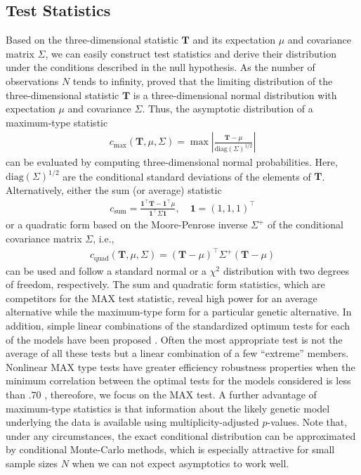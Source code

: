\documentclass[bimj,fleqn]{w-art}
\newcommand{\T}{\mathbf{T}}
\begin{document}
\subsection{Test Statistics}

Based on the three-dimensional statistic $\T$ and its expectation 
$\mu$ and covariance matrix $\Sigma$, we can easily construct test 
statistics and derive their distribution under the conditions
described in the null hypothesis. As the number of observations 
$N$ tends to infinity, \citet{StrasserWeber1999}
proved that the limiting distribution of the three-dimensional 
statistic $\T$ is a three-dimensional normal distribution with 
expectation $\mu$ and covariance $\Sigma$. Thus, the asymptotic distribution
of a maximum-type statistic
\begin{eqnarray*}
c_\text{max}(\T, \mu, \Sigma)  = \max \left| \frac{\T - \mu}{\text{diag}(\Sigma)^{1/2}} \right|
\end{eqnarray*}
can be evaluated by computing three-dimensional normal probabilities. Here,
$\text{diag}(\Sigma)^{1/2}$ are the conditional standard deviations of
the elements of $\T$. Alternatively, either the sum (or average) statistic
\begin{eqnarray*}
c_\text{sum} = \frac{\mathbf{1}^\top \T - \mathbf{1}^\top\mu}{\mathbf{1}^\top \Sigma \mathbf{1}}, \quad \mathbf{1} = (1, 1, 1)^\top
\end{eqnarray*}
or a quadratic form 
based on the Moore-Penrose inverse $\Sigma^+$ of the conditional covariance
matrix $\Sigma$, i.e.,
\begin{eqnarray*}
c_\text{quad}(\T, \mu, \Sigma)  = (\T - \mu)^\top \Sigma^+ (\T - \mu)
\end{eqnarray*}
can be used and 
follow a standard normal or a $\chi^2$ distribution with two degrees of freedom, respectively. 
The sum and quadratic form statistics, which are competitors for the MAX 
test statistic, reveal high power for an average alternative while the maximum-type 
form for a particular genetic alternative.
In addition, simple linear combinations of the standardized optimum tests for each of
the models have been proposed \citep{Gastwirth:1985}. Often the most appropriate test is not the
average of all these tests but a linear combination of a few ``extreme'' members. Nonlinear
MAX type tests have greater efficiency robustness properties when the minimum
correlation between the optimal tests for the models considered is less than $.70$ 
\citep{Freidlin+Podgor+Gastwirth:1999}, thereofore, we focus on the MAX test. A further advantage of 
maximum-type statistics is that information about the likely genetic model underlying the data 
is available using multiplicity-adjusted $p$-values.
Note that, under any circumstances, the exact conditional distribution 
can be approximated by conditional Monte-Carlo methods, which is especially 
attractive for small sample sizes $N$ when we can not expect asymptotics 
to work well.
\end{document}
